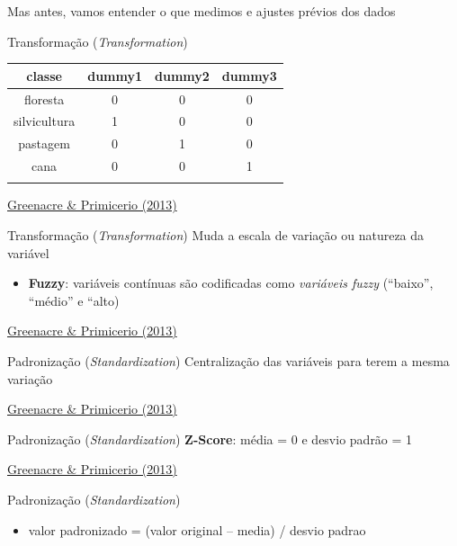 \documentclass[
  ignorenonframetext,
]{beamer}
\providecommand{\tightlist}{%
  \setlength{\itemsep}{0pt}\setlength{\parskip}{0pt}}\usepackage{longtable,booktabs,array}
\begin{document}
\begin{frame}{Mas antes, vamos entender o que medimos e ajustes prévios
dos dados}
\begin{block}{Transformação (\emph{Transformation})}
\begin{longtable}[]{@{}cccc@{}}
\toprule\noalign{}
classe & dummy1 & dummy2 & dummy3 \\
\midrule\noalign{}
\endhead
floresta & 0 & 0 & 0 \\
silvicultura & 1 & 0 & 0 \\
pastagem & 0 & 1 & 0 \\
cana & 0 & 0 & 1 \\
\bottomrule\noalign{}
\end{longtable}

\href{https://www.fbbva.es/microsite/multivariate-statistics/}{Greenacre
\& Primicerio (2013)}
\end{block}

\begin{block}{Transformação (\emph{Transformation})}
\protect\hypertarget{transformauxe7uxe3o-transformation-4}{}
Muda a escala de variação ou natureza da variável

\begin{itemize}
\tightlist
\item
  \textbf{Fuzzy}: variáveis contínuas são codificadas como
  \emph{variáveis fuzzy} (``baixo'', ``médio'' e ``alto)
\end{itemize}

\href{https://www.fbbva.es/microsite/multivariate-statistics/}{Greenacre
\& Primicerio (2013)}
\end{block}

\begin{block}{Padronização (\emph{Standardization})}
\protect\hypertarget{padronizauxe7uxe3o-standardization}{}
Centralização das variáveis para terem a mesma variação

\href{https://www.fbbva.es/microsite/multivariate-statistics/}{Greenacre
\& Primicerio (2013)}
\end{block}

\begin{block}{Padronização (\emph{Standardization})}
\protect\hypertarget{padronizauxe7uxe3o-standardization-1}{}
\textbf{Z-Score}: média = 0 e desvio padrão = 1

\href{https://www.fbbva.es/microsite/multivariate-statistics/}{Greenacre
\& Primicerio (2013)}
\end{block}

\begin{block}{Padronização (\emph{Standardization})}
\protect\hypertarget{padronizauxe7uxe3o-standardization-2}{}
\begin{itemize}
\tightlist
\item
  valor padronizado = (valor original -- media) / desvio padrao
\end{itemize}


\end{block}
\end{frame}
\end{document}
